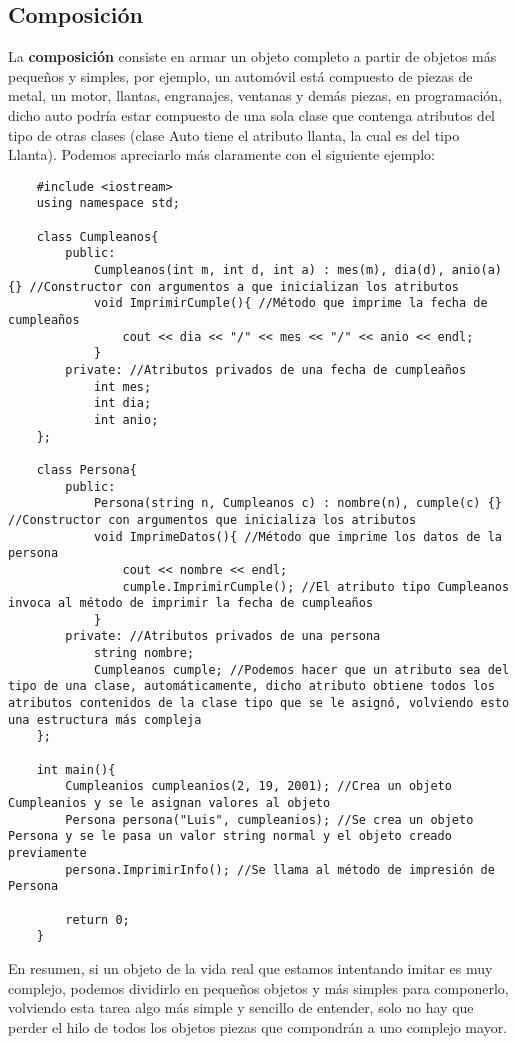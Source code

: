 \subsection{Composición}
La \textbf{composición} consiste en armar un objeto completo a partir de objetos más pequeños y simples, por ejemplo, un automóvil está compuesto de piezas de metal, un motor, llantas, engranajes, ventanas y demás piezas, en programación, dicho auto podría estar compuesto de una sola clase que contenga atributos del tipo de otras clases (clase Auto tiene el atributo llanta, la cual es del tipo Llanta). Podemos apreciarlo más claramente con el siguiente ejemplo:
\begin{lstlisting}
    #include <iostream>
    using namespace std;

    class Cumpleanos{
        public:
            Cumpleanos(int m, int d, int a) : mes(m), dia(d), anio(a) {} //Constructor con argumentos a que inicializan los atributos
            void ImprimirCumple(){ //Método que imprime la fecha de cumpleaños
                cout << dia << "/" << mes << "/" << anio << endl;
            }
        private: //Atributos privados de una fecha de cumpleaños
            int mes;
            int dia;
            int anio;
    };
    
    class Persona{
        public:
            Persona(string n, Cumpleanos c) : nombre(n), cumple(c) {} //Constructor con argumentos que inicializa los atributos
            void ImprimeDatos(){ //Método que imprime los datos de la persona
                cout << nombre << endl;
                cumple.ImprimirCumple(); //El atributo tipo Cumpleanos invoca al método de imprimir la fecha de cumpleaños
            }
        private: //Atributos privados de una persona
            string nombre;
            Cumpleanos cumple; //Podemos hacer que un atributo sea del tipo de una clase, automáticamente, dicho atributo obtiene todos los atributos contenidos de la clase tipo que se le asignó, volviendo esto una estructura más compleja
    };
    
    int main(){
        Cumpleanios cumpleanios(2, 19, 2001); //Crea un objeto Cumpleanios y se le asignan valores al objeto
        Persona persona("Luis", cumpleanios); //Se crea un objeto Persona y se le pasa un valor string normal y el objeto creado previamente
        persona.ImprimirInfo(); //Se llama al método de impresión de Persona
    
        return 0;
    }
\end{lstlisting}
En resumen, si un objeto de la vida real que estamos intentando imitar es muy complejo, podemos dividirlo en pequeños objetos y más simples para componerlo, volviendo esta tarea algo más simple y sencillo de entender, solo no hay que perder el hilo de todos los objetos piezas que compondrán a uno complejo mayor.



